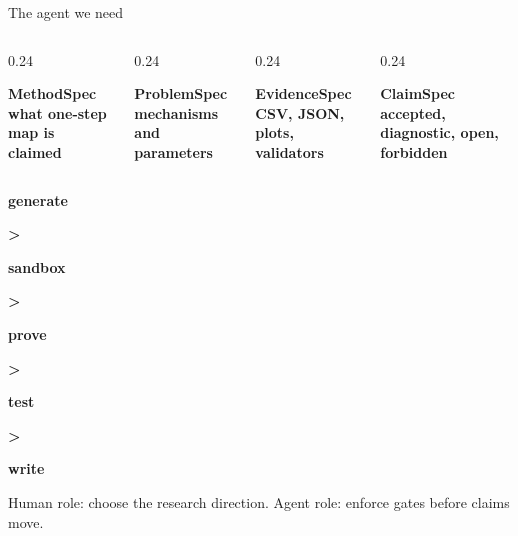 \documentclass[aspectratio=169,10pt]{beamer}
\newcommand{\panel}[2]{%
  \begingroup
  \setlength{\fboxsep}{0.16cm}%
  \colorbox{LightBG}{\begin{minipage}{#1}#2\end{minipage}}%
  \endgroup
}
\newcommand{\colorpanel}[3]{%
  \begingroup
  \setlength{\fboxsep}{0.16cm}%
  \colorbox{#1}{\begin{minipage}{#2}#3\end{minipage}}%
  \endgroup
}
\newcommand{\badge}[2]{\colorbox{#1}{\strut\hspace{0.35em}\color{white}\bfseries #2\hspace{0.35em}}}
\begin{document}
\begin{frame}{The agent we need}
  \begin{columns}[T,onlytextwidth]
    \begin{column}{0.24\textwidth}
      \panel{\linewidth}{\centering\color{UWRed}\bfseries MethodSpec\\\scriptsize what one-step map is claimed}
    \end{column}
    \begin{column}{0.24\textwidth}
      \panel{\linewidth}{\centering\color{BlueAccent}\bfseries ProblemSpec\\\scriptsize mechanisms and parameters}
    \end{column}
    \begin{column}{0.24\textwidth}
      \panel{\linewidth}{\centering\color{GreenAccent}\bfseries EvidenceSpec\\\scriptsize CSV, JSON, plots, validators}
    \end{column}
    \begin{column}{0.24\textwidth}
      \panel{\linewidth}{\centering\color{OrangeAccent}\bfseries ClaimSpec\\\scriptsize accepted, diagnostic, open, forbidden}
    \end{column}
  \end{columns}

  \vspace{0.65cm}
  \centering
  \badge{UWRed}{generate}\quad
  {\color{UWRed}\bfseries >}\quad
  \badge{BlueAccent}{sandbox}\quad
  {\color{BlueAccent}\bfseries >}\quad
  \badge{GreenAccent}{prove}\quad
  {\color{GreenAccent}\bfseries >}\quad
  \badge{OrangeAccent}{test}\quad
  {\color{OrangeAccent}\bfseries >}\quad
  \badge{DarkText}{write}

  \vspace{0.75cm}
  \colorpanel{LightBG}{0.85\linewidth}{\centering
  Human role: choose the research direction. Agent role: enforce gates before claims move.}
\end{frame}
\end{document}
